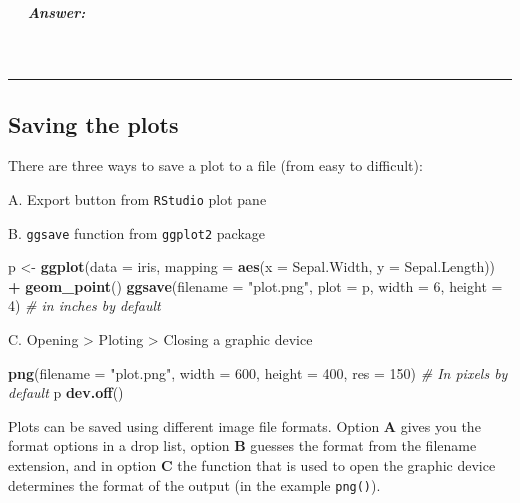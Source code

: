 \documentclass[
]{article}
\newenvironment{Shaded}{\begin{snugshade}}{\end{snugshade}}
\newcommand{\AttributeTok}[1]{\textcolor[rgb]{0.13,0.29,0.53}{#1}}
\newcommand{\CommentTok}[1]{\textcolor[rgb]{0.56,0.35,0.01}{\textit{#1}}}
\newcommand{\DecValTok}[1]{\textcolor[rgb]{0.00,0.00,0.81}{#1}}
\newcommand{\FunctionTok}[1]{\textcolor[rgb]{0.13,0.29,0.53}{\textbf{#1}}}
\newcommand{\NormalTok}[1]{#1}
\newcommand{\OtherTok}[1]{\textcolor[rgb]{0.56,0.35,0.01}{#1}}
\newcommand{\SpecialCharTok}[1]{\textcolor[rgb]{0.81,0.36,0.00}{\textbf{#1}}}
\newcommand{\StringTok}[1]{\textcolor[rgb]{0.31,0.60,0.02}{#1}}
\begin{document}
\subparagraph{  Answer:}\label{answer-8}

 

\begin{center}\rule{0.5\linewidth}{0.5pt}\end{center}

\subsection{\texorpdfstring{ Saving the
plots}{ Saving the plots}}\label{saving-the-plots}

There are three ways to save a plot to a file (from easy to difficult):

A. Export button from \texttt{RStudio} plot pane

B. \texttt{ggsave} function from \texttt{ggplot2} package

\begin{Shaded}
\begin{Highlighting}[]
\NormalTok{p }\OtherTok{\textless{}{-}} \FunctionTok{ggplot}\NormalTok{(}\AttributeTok{data =}\NormalTok{ iris, }\AttributeTok{mapping =} \FunctionTok{aes}\NormalTok{(}\AttributeTok{x =}\NormalTok{ Sepal.Width, }\AttributeTok{y =}\NormalTok{ Sepal.Length)) }\SpecialCharTok{+} \FunctionTok{geom\_point}\NormalTok{()}
\FunctionTok{ggsave}\NormalTok{(}\AttributeTok{filename =} \StringTok{"plot.png"}\NormalTok{, }\AttributeTok{plot =}\NormalTok{ p, }\AttributeTok{width =} \DecValTok{6}\NormalTok{, }\AttributeTok{height =} \DecValTok{4}\NormalTok{) }\CommentTok{\# in inches by default}
\end{Highlighting}
\end{Shaded}

C. Opening \textgreater{} Ploting \textgreater{} Closing a graphic
device

\begin{Shaded}
\begin{Highlighting}[]
\FunctionTok{png}\NormalTok{(}\AttributeTok{filename =} \StringTok{"plot.png"}\NormalTok{, }\AttributeTok{width =} \DecValTok{600}\NormalTok{, }\AttributeTok{height =} \DecValTok{400}\NormalTok{, }\AttributeTok{res =} \DecValTok{150}\NormalTok{) }\CommentTok{\# In pixels by default}
\NormalTok{p}
\FunctionTok{dev.off}\NormalTok{()}
\end{Highlighting}
\end{Shaded}

Plots can be saved using different image file formats. Option \textbf{A}
gives you the format options in a drop list, option \textbf{B} guesses
the format from the filename extension, and in option \textbf{C} the
function that is used to open the graphic device determines the format
of the output (in the example \texttt{png()}).
\end{document}
